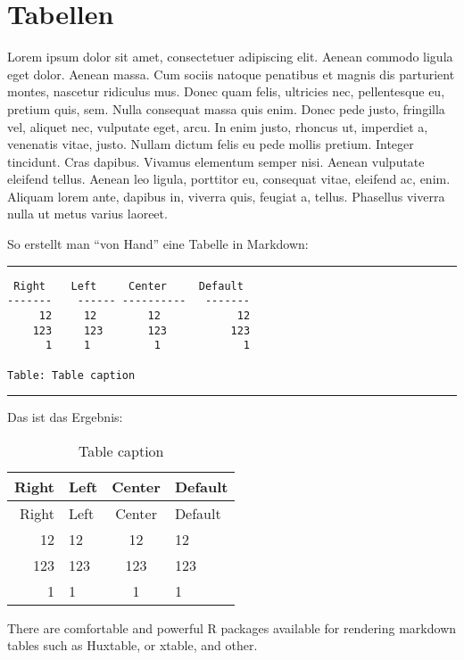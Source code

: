 \documentclass[11pt,ngerman,a4paper,oneside]{article}
\begin{document}
\hypertarget{tabellen}{%
\section{Tabellen}\label{tabellen}}

Lorem ipsum dolor sit amet, consectetuer adipiscing elit. Aenean commodo
ligula eget dolor. Aenean massa. Cum sociis natoque penatibus et magnis
dis parturient montes, nascetur ridiculus mus. Donec quam felis,
ultricies nec, pellentesque eu, pretium quis, sem. Nulla consequat massa
quis enim. Donec pede justo, fringilla vel, aliquet nec, vulputate eget,
arcu. In enim justo, rhoncus ut, imperdiet a, venenatis vitae, justo.
Nullam dictum felis eu pede mollis pretium. Integer tincidunt. Cras
dapibus. Vivamus elementum semper nisi. Aenean vulputate eleifend
tellus. Aenean leo ligula, porttitor eu, consequat vitae, eleifend ac,
enim. Aliquam lorem ante, dapibus in, viverra quis, feugiat a, tellus.
Phasellus viverra nulla ut metus varius laoreet.

So erstellt man ``von Hand'' eine Tabelle in Markdown:

\begin{center}\rule{0.5\linewidth}{0.5pt}\end{center}

\begin{verbatim}
 Right    Left     Center     Default
-------    ------ ----------   -------
     12     12        12            12
    123     123       123          123
      1     1          1             1
      
Table: Table caption
\end{verbatim}

\begin{center}\rule{0.5\linewidth}{0.5pt}\end{center}

Das ist das Ergebnis:

\begin{longtable}[]{@{}rlcl@{}}
\caption{Table caption}\tabularnewline
\toprule
Right & Left & Center & Default\tabularnewline
\midrule
\endfirsthead
\toprule
Right & Left & Center & Default\tabularnewline
\midrule
\endhead
12 & 12 & 12 & 12\tabularnewline
123 & 123 & 123 & 123\tabularnewline
1 & 1 & 1 & 1\tabularnewline
\bottomrule
\end{longtable}

There are comfortable and powerful R packages available for rendering
markdown tables such as Huxtable, or xtable, and other.
\end{document}

